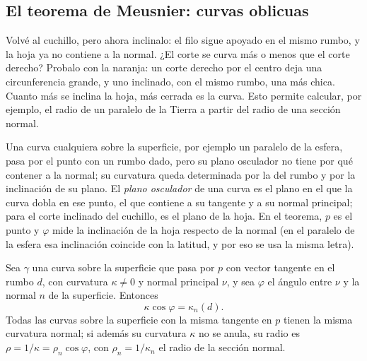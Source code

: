 
\subsection{El teorema de Meusnier: curvas oblicuas}

Volvé al cuchillo, pero ahora inclinalo: el filo sigue apoyado en el mismo rumbo, y la hoja ya
no contiene a la normal. ¿El corte se curva más o menos que el corte derecho? Probalo con la
naranja: un corte derecho por el centro deja una circunferencia grande, y uno inclinado, con el
mismo rumbo, una más chica. Cuanto más se inclina la hoja, más cerrada es la curva. Esto
permite calcular, por ejemplo, el radio de un paralelo de la Tierra a partir del radio de una
sección normal.

Una curva cualquiera sobre la superficie, por ejemplo un paralelo de la esfera, pasa por el
punto con un rumbo dado, pero su plano osculador no tiene por qué contener a la normal; su
curvatura queda determinada por la del rumbo y por la inclinación de su plano. El \emph{plano
osculador} de una curva es el plano en el que la curva dobla en ese punto, el que contiene a su
tangente y a su normal principal; para el corte inclinado del cuchillo, es el plano de la hoja.
En el teorema, \(p\) es el punto y \(\varphi\) mide la inclinación de la hoja respecto de la
normal (en el paralelo de la esfera esa inclinación coincide con la latitud, y por eso se usa
la misma letra).

\begin{teorema}[Meusnier]\label{teo:meusnier}
Sea \(\gamma\) una curva sobre la superficie que pasa por \(p\) con vector tangente en el
rumbo \(d\), con curvatura \(\kappa\neq0\) y normal principal \(\nu\), y sea \(\varphi\) el
ángulo entre \(\nu\) y la normal \(n\) de la superficie. Entonces
\[
  \kappa\cos\varphi=\kappa_n(d).
\]
Todas las curvas sobre la superficie con la misma tangente en \(p\) tienen la misma
curvatura normal; si además su curvatura \(\kappa\) no se anula, su radio es
\(\rho=1/\kappa=\rho_n\cos\varphi\), con \(\rho_n=1/\kappa_n\) el radio de la sección normal.
\end{teorema}

